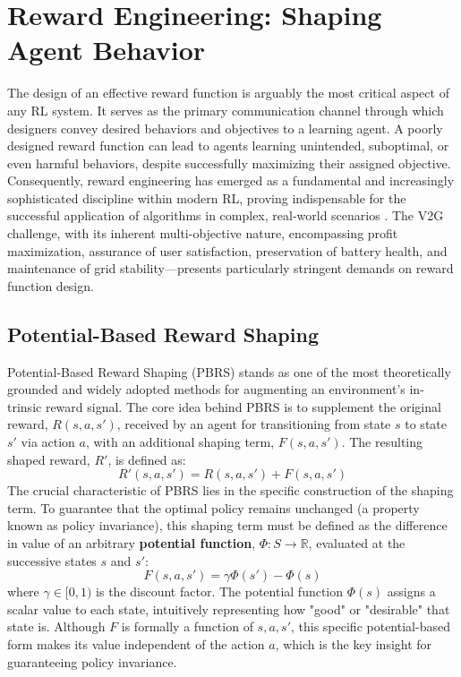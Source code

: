 \section{Reward Engineering: Shaping Agent Behavior}
\label{sec:reward_shaping}

The design of an effective reward function is arguably the most critical aspect of any RL system.
It serves as the primary communication channel through which designers convey desired behaviors and objectives to a learning agent. 
A poorly designed reward function can lead to agents learning unintended, suboptimal, or even harmful behaviors, despite successfully maximizing their assigned objective.
Consequently, reward engineering has emerged as a fundamental and increasingly sophisticated discipline within modern RL,
proving indispensable for the successful application of algorithms in complex, real-world scenarios \cite{ibrahim2024comprehensive}.
\noindent
The V2G challenge, with its inherent multi-objective nature, encompassing profit maximization, assurance of user satisfaction, preservation of battery health, and maintenance of grid stability—presents particularly stringent demands on reward function design.

\subsection{Potential-Based Reward Shaping}
Potential-Based Reward Shaping (PBRS) stands as one of the most theoretically
grounded and widely adopted methods for augmenting an environment's in-
trinsic reward signal. The core idea behind PBRS is to supplement the original
reward, $R(s, a, s')$, received by an agent for transitioning from state $s$ to state $s'$ via
action $a$, with an additional shaping term, $F(s, a, s')$. The resulting shaped reward,
$R'$, is defined as:
\begin{equation}
    R'(s, a, s') = R(s, a, s') + F(s, a, s')
\end{equation}
\noindent
The crucial characteristic of PBRS lies in the specific construction of the shaping
term. To guarantee that the optimal policy remains unchanged (a property known as policy invariance), this shaping term must be defined as the difference in value of an arbitrary \textbf{potential function}, $\Phi: S \to \mathbb{R}$, evaluated at the successive states $s$ and $s'$:
\begin{equation}
    F(s, a, s') = \gamma\Phi(s') - \Phi(s)
\end{equation}
where $\gamma \in [0, 1)$ is the discount factor. The
potential function $\Phi(s)$ assigns a scalar value to each state, intuitively representing
how "good" or "desirable" that state is. Although $F$ is formally a function of $s, a, s'$, this specific potential-based form makes its value independent of the action $a$, which is the key insight for guaranteeing policy invariance.

